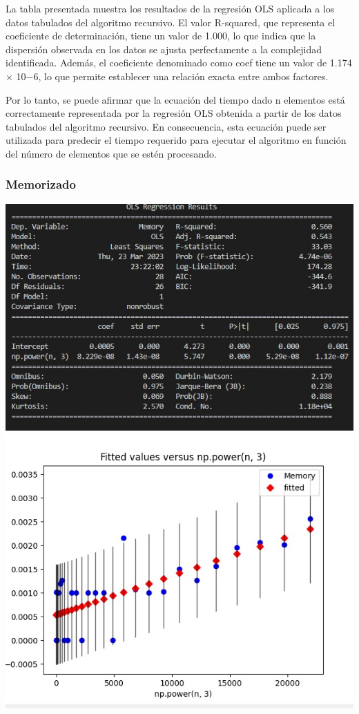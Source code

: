 \documentclass[11pt]{article}
\begin{document}
La tabla presentada muestra los resultados de la regresión OLS aplicada
a los datos tabulados del algoritmo recursivo. El valor R-squared, que
representa el coeficiente de determinación, tiene un valor de 1.000, lo
que indica que la dispersión observada en los datos se ajusta
perfectamente a la complejidad identificada. Además, el coeficiente
denominado como coef tiene un valor de 1.174 × 10−6, lo que permite
establecer una relación exacta entre ambos factores.

Por lo tanto, se puede afirmar que la ecuación del tiempo dado n
elementos está correctamente representada por la regresión OLS obtenida
a partir de los datos tabulados del algoritmo recursivo. En
consecuencia, esta ecuación puede ser utilizada para predecir el tiempo
requerido para ejecutar el algoritmo en función del número de elementos
que se estén procesando.

\hypertarget{memorizado}{%
\subsubsection{Memorizado}\label{memorizado}}

\includegraphics{OLSTABLA2.jpg} \includegraphics{OLSGRAFICO2.jpg}
\end{document}
